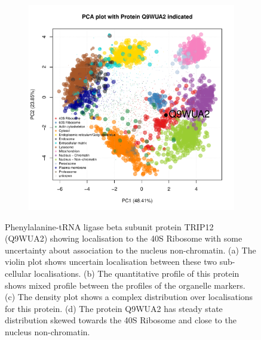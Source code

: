 \documentclass[12pt,english]{article}\usepackage[]{graphicx}\usepackage[]{color}
\makeatletter
\def\maxwidth{ %
  \ifdim\Gin@nat@width>\linewidth
    \linewidth
  \else
    \Gin@nat@width
  \fi
}
\newenvironment{knitrout}{}{} %
\makeatother
\begin{document}
\begin{figure}[h]
\begin{subfigure}[t]{0.5\textwidth}
\begin{knitrout}
{}



\end{knitrout}
    \caption{}
  \end{subfigure}%
  \begin{subfigure}[t]{0.5\textwidth}
    \centering
\begin{knitrout}
\color{fgcolor}

{\centering \includegraphics[width=\maxwidth]{figure/Q9WUA2-pca-1} 

}



\end{knitrout}
    \caption{}
  \end{subfigure}

  \caption{Phenylalanine-tRNA ligase beta subunit protein TRIP12
    (Q9WUA2) showing localisation to the 40S Ribosome with some
    uncertainty about association to the nucleus non-chromatin.  (a)
    The violin plot shows uncertain localisation between these two
    sub-cellular localisations. (b) The quantitative profile of this
    protein shows mixed profile between the profiles of the organelle
    markers. (c) The density plot shows a complex distribution over
    localisations for this protein. (d) The protein Q9WUA2 has steady
    state distribution skewed towards the 40S Ribosome and close to
    the nucleus non-chromatin.}
  \label{fig:Q9WUA2}
\end{figure}
\end{document}
